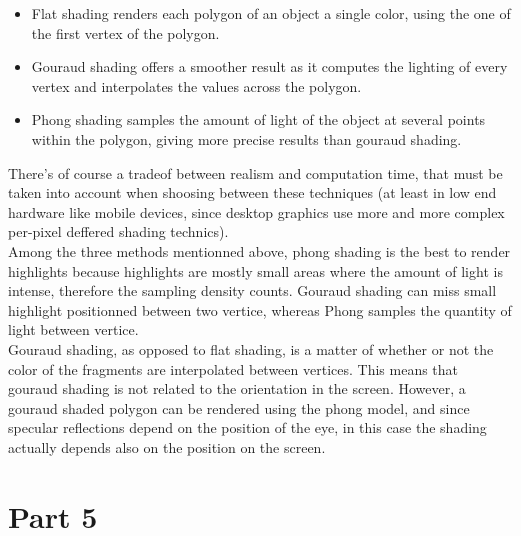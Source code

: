 \begin{itemize}
    \item Flat shading renders each polygon of an object a single color, using
    the one of the first vertex of the polygon.
    \item Gouraud shading offers a smoother result as it computes the lighting of
    every vertex and interpolates the values across the polygon.
    \item Phong shading samples the amount of light of the object at several points
    within the polygon, giving more precise results than gouraud shading.
\end{itemize}
There's of course a tradeof between realism and computation time, that must be taken
into account when shoosing between these techniques (at least in low end hardware
like mobile devices, since desktop graphics use more and more complex per-pixel deffered
shading technics).\\
Among the three methods mentionned above, phong shading is the best to render highlights
because highlights are mostly small areas where the amount of light is intense,
therefore the sampling density counts. Gouraud shading can miss small highlight
positionned between two vertice, whereas Phong samples the quantity of light between
vertice. \\
Gouraud shading, as opposed to flat shading, is a matter of whether or not the color of the fragments
are interpolated between vertices. This means that gouraud shading is not related to the orientation in the screen.
However, a gouraud shaded polygon can be rendered using the phong model, and since specular reflections depend on 
the position of the eye, in this case the shading actually depends also on the position on the screen.

\section{Part 5}


